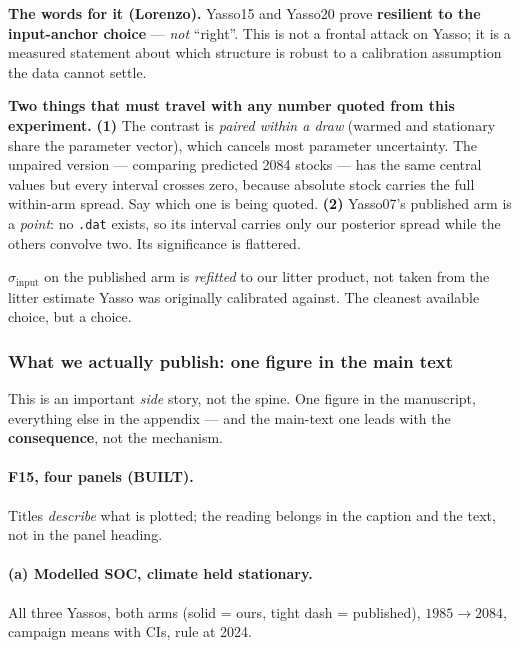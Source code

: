 \documentclass[11pt]{article}
\newcommand{\sinput}{\sigma_{\mathrm{input}}}
\begin{document}
\begin{note}
\textbf{The words for it (Lorenzo).} Yasso15 and Yasso20 prove \textbf{resilient to the input-anchor
choice} --- \emph{not} ``right''. This is not a frontal attack on Yasso; it is a measured statement
about which structure is robust to a calibration assumption the data cannot settle.
\end{note}

\begin{warn}
\textbf{Two things that must travel with any number quoted from this experiment.}
\textbf{(1)} The contrast is \emph{paired within a draw} (warmed and stationary share the parameter
vector), which cancels most parameter uncertainty. The unpaired version --- comparing predicted 2084
stocks --- has the same central values but every interval crosses zero, because absolute stock
carries the full within-arm spread. Say which one is being quoted.
\textbf{(2)} Yasso07's published arm is a \emph{point}: no \texttt{.dat} exists, so its interval
carries only our posterior spread while the others convolve two. Its significance is flattered.
\end{warn}

\begin{warn}
$\sinput$ on the published arm is \emph{refitted} to our litter product, not taken from the litter
estimate Yasso was originally calibrated against. The cleanest available choice, but a choice.
\end{warn}

\subsubsection{What we actually publish: one figure in the main text}
\begin{note}
This is an important \emph{side} story, not the spine. One figure in the manuscript, everything
else in the appendix --- and the main-text one leads with the \textbf{consequence}, not the
mechanism.
\end{note}

\paragraph{F15, four panels (BUILT).} Titles \emph{describe} what is plotted; the reading belongs
in the caption and the text, not in the panel heading.
\paragraph{(a) Modelled SOC, climate held stationary.} All three Yassos, both arms
(solid = ours, tight dash = published), $1985 \to 2084$, campaign means with CIs, rule at 2024.
\end{document}
